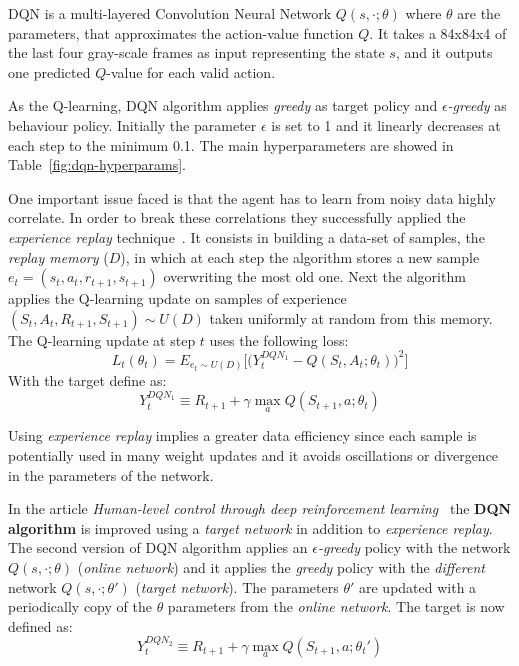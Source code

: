 DQN is a multi-layered Convolution Neural Network $Q(s, \cdotp; \theta)$ %
where $\theta$ are the parameters, that approximates the action-value function $Q$. It takes a 84x84x4 of the last four gray-scale frames as input representing the state $s$, and it outputs one predicted $Q$-value for each valid action.  

As the Q-learning, DQN algorithm applies \textit{greedy} as target policy and \textit{$\epsilon$-greedy} as behaviour policy. Initially the parameter $\epsilon$ is set to 1 and it linearly decreases at each step to the minimum 0.1. The main hyperparameters are showed in Table~\ref{fig:dqn-hyperparams}.

One important issue faced is that the agent has to learn from noisy data highly correlate. In order to break these correlations they successfully applied the \textit{experience replay} technique~\cite{Lin:1992:RLR:168871}. It consists in building a data-set of samples, the \textit{replay memory} ($D$), in which at each step the algorithm stores a new sample $e_t = (s_t, a_t, r_{t+1}, s_{t+1})$ overwriting the most old one. Next the algorithm applies the Q-learning update on samples of experience $(S_t, A_t, R_{t+1}, S_{t+1}) \sim U(D)$ taken uniformly at random from this memory. The Q-learning update at step $t$ uses the following loss:
\begin{equation}
	L_t(\theta_t) = E_{e_t \sim U(D)} %
		\Big[ \Big( Y^{DQN_1}_t - Q(S_t, A_t;\theta_t) \Big)^2 \Big]
\end{equation}
With the target define as:
\begin{equation}
Y^{DQN_1}_t \equiv R_{t+1} + \gamma \max_{a} Q(S_{t+1}, a; \theta_t)
\end{equation}

Using \textit{experience replay} implies a greater data efficiency since each sample is potentially used in many weight updates and it avoids oscillations or divergence in the parameters of the network.


In the article \textit{Human-level control through deep reinforcement learning}~\cite{Mnih2015} the \textbf{DQN algorithm} is improved using a \textit{target network} in addition to \textit{experience replay}.
The second version of DQN algorithm applies an \textit{$\epsilon$-greedy} policy with the network $Q(s, \cdotp; \theta)$ (\textit{online network}) and it applies the \textit{greedy} policy with the \emph{different} network $Q(s, \cdotp; \theta')$ (\textit{target network}). The parameters $\theta'$ are updated with a periodically copy of the $\theta$ parameters from the \textit{online network}. The target is now defined as:
\begin{equation}
Y^{DQN_2}_t \equiv R_{t+1} + \gamma \max_{a} Q(S_{t+1}, a; \theta_t')
\end{equation}

